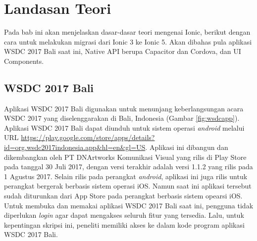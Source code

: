 \setcounter{secnumdepth}{4}
\chapter{Landasan Teori}
\label{chap:teori}

Pada bab ini akan menjelaskan dasar-dasar teori mengenai Ionic, berikut dengan cara untuk melakukan migrasi dari Ionic 3 ke Ionic 5. Akan dibahas pula aplikasi WSDC 2017 Bali saat ini, Native API berupa Capacitor dan Cordova, dan UI Components.

\section{WSDC 2017 Bali}
\label{sec:wsdc2017bali}

Aplikasi WSDC 2017 Bali digunakan untuk menunjang keberlangsungan acara WSDC 2017 yang diselenggarakan di Bali, Indonesia (Gambar \ref{fig:wsdcapp}). Aplikasi WSDC 2017 Bali dapat diunduh untuk sistem operasi {\it android} melalui URL \url{https://play.google.com/store/apps/details?id=org.wsdc2017indonesia.app&hl=en&gl=US}. Aplikasi ini dibangun dan dikembangkan oleh PT DNArtworks Komunikasi Visual yang rilis di Play Store pada tanggal 30 Juli 2017, dengan versi terakhir adalah versi 1.1.2 yang rilis pada 1 Agustus 2017. Selain rilis pada perangkat {\it android}, aplikasi ini juga rilis untuk perangkat bergerak berbasis sistem operasi iOS. Namun saat ini aplikasi tersebut sudah diturunkan dari App Store pada perangkat berbasis sistem opearsi iOS. Untuk membuka dan memakai aplikasi WSDC 2017 Bali saat ini, pengguna tidak diperlukan {\it login} agar dapat mengakses seluruh fitur yang tersedia. Lalu, untuk kepentingan skripsi ini, peneliti memiliki akses ke dalam kode program aplikasi WSDC 2017 Bali.

